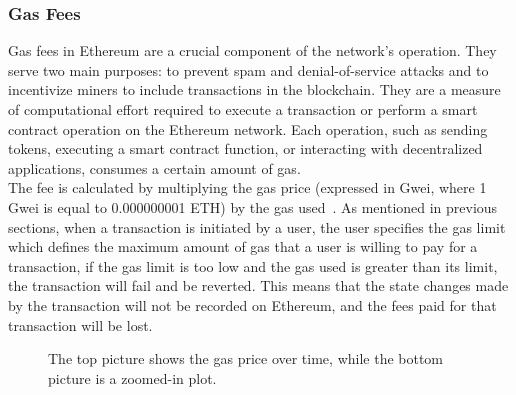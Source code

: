 \subsubsection{Gas Fees}
Gas fees in Ethereum are a crucial component of the network's operation. They serve two main purposes: to prevent spam and denial-of-service attacks and to incentivize miners to include transactions in the blockchain. They are a measure of computational effort required to execute a transaction or perform a smart contract operation on the Ethereum network. Each operation, such as sending tokens, executing a smart contract function, or interacting with decentralized applications, consumes a certain amount of gas.
\\[5mm]
The fee is calculated by multiplying the gas price (expressed in Gwei, where 1 Gwei is equal to 0.000000001 ETH) by the gas used~\cite{noauthor_gas_nodate}. As mentioned in previous sections, when a transaction is initiated by a user, the user specifies the gas limit which defines the maximum amount of gas that a user is willing to pay for a transaction, if the gas limit is too low and the gas used is greater than its limit, the transaction will fail and be reverted. This means that the state changes made by the transaction will not be recorded on Ethereum, and the fees paid for that transaction will be lost.

\begin{figure}[!htb]
    \centering
    \begin{subfigure}[b]{\textwidth}
    \end{subfigure}
    \hfill
    \begin{subfigure}[b]{\textwidth}
        \centering
    \end{subfigure}
    \vspace{-0.8cm}
    \caption{The top picture shows the gas price over time, while the bottom picture is a zoomed-in plot.}
    \label{fig:gwei_over_time}
\end{figure}

